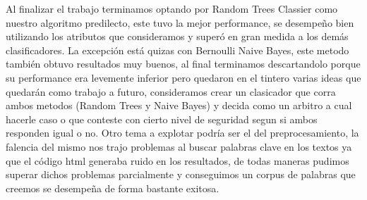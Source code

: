 Al  finalizar el trabajo terminamos optando por Random Trees Classier como nuestro algoritmo predilecto, este tuvo la mejor performance, se desempeño bien utilizando los atributos que consideramos y superó en gran medida a los demás clasificadores. La excepción está quizas con Bernoulli Naive Bayes, este metodo también obtuvo resultados muy buenos, al final terminamos descartandolo porque su performance era levemente inferior pero quedaron en el tintero varias ideas que quedarán como trabajo a futuro, consideramos crear un clasicador que corra ambos metodos (Random Trees y Naive Bayes) y decida como un arbitro a cual hacerle caso o que conteste con cierto nivel de seguridad segun si ambos responden igual o no. Otro tema a explotar podría ser el del preprocesamiento, la falencia del mismo nos trajo problemas al buscar palabras clave en los textos ya que el código html generaba ruido en los resultados, de todas maneras pudimos superar dichos problemas parcialmente y conseguimos un corpus de palabras que creemos se desempeña de forma bastante exitosa.